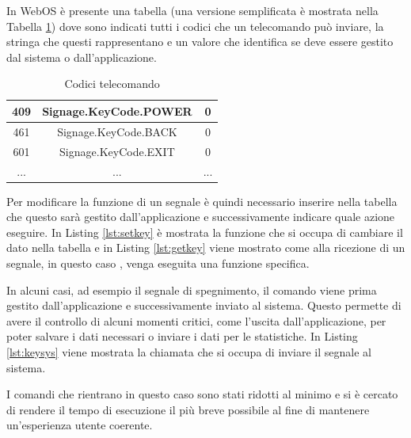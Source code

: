 In WebOS è presente una tabella (una versione semplificata è mostrata nella Tabella \ref*{tab:keycode}) dove sono indicati tutti i codici che un telecomando può inviare, la stringa che questi rappresentano e un valore che identifica se deve essere gestito dal sistema o dall'applicazione.

\begin{table}
    \centering
    \begin{tabular}{ |c|c|c| } 
         \hline
         409 & Signage.KeyCode.POWER & 0 \\  
         \hline
         461 & Signage.KeyCode.BACK & 0 \\  
         \hline
         601 & Signage.KeyCode.EXIT & 0 \\  
         \hline
         ... & ... & ...\\
         \hline
    \end{tabular}
    \caption{Codici telecomando} \label{tab:keycode}
\end{table}
    
Per modificare la funzione di un segnale è quindi necessario inserire nella tabella che questo sarà gestito dall'applicazione e successivamente indicare quale azione eseguire. In Listing \ref*{lst:setkey} è mostrata la funzione che si occupa di cambiare il dato nella tabella e in Listing \ref*{lst:getkey} viene mostrato come alla ricezione di un segnale, in questo caso , venga eseguita una funzione specifica.




In alcuni casi, ad esempio il segnale di spegnimento, il comando viene prima gestito dall'applicazione e successivamente inviato al sistema. Questo permette di avere il controllo di alcuni momenti critici, come l'uscita dall'applicazione, per poter salvare i dati necessari o inviare i dati per le statistiche.
In Listing \ref*{lst:keysys} viene mostrata la chiamata che si occupa di inviare il segnale al sistema.



I comandi che rientrano in questo caso sono stati ridotti al minimo e si è cercato di rendere il tempo di esecuzione il più breve possibile al fine di mantenere un'esperienza utente coerente.

